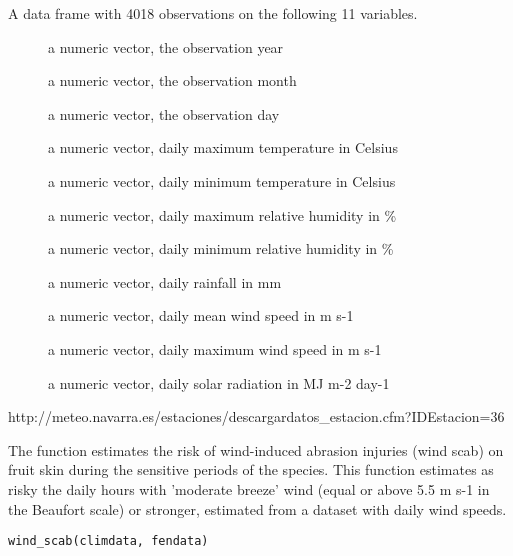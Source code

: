 \documentclass[a4paper]{book}
\begin{document}
\begin{Format}
A data frame with 4018 observations on the following 11 variables.
\begin{description}

\item[] a numeric vector, the observation year
\item[] a numeric vector, the observation month
\item[] a numeric vector, the observation day
\item[] a numeric vector, daily maximum temperature in Celsius
\item[] a numeric vector, daily minimum temperature in Celsius
\item[] a numeric vector, daily maximum relative humidity in \%
\item[] a numeric vector, daily minimum relative humidity in \%
\item[] a numeric vector, daily rainfall in mm
\item[] a numeric vector, daily mean wind speed in m s-1
\item[] a numeric vector, daily maximum wind speed in m s-1
\item[] a numeric vector, daily solar radiation in MJ m-2 day-1

\end{description}

\end{Format}
%
\begin{Source}\relax
http://meteo.navarra.es/estaciones/descargardatos\_estacion.cfm?IDEstacion=36
\end{Source}
%
\begin{Description}\relax
The function estimates the risk of wind-induced abrasion injuries
(wind scab) on fruit skin during the sensitive periods of the 
species. This function estimates as risky the daily hours with 
'moderate breeze' wind (equal or above 5.5 m s-1 in the Beaufort 
scale) or stronger, estimated from a dataset with daily wind 
speeds.
\end{Description}
%
\begin{Usage}
\begin{verbatim}
wind_scab(climdata, fendata)
\end{verbatim}
\end{Usage}
\end{document}
